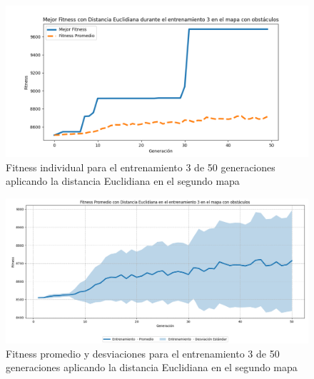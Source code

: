 \documentclass[lettersize, journal]{IEEEtran}
\begin{document}
\begin{figure}[H]
    \centering
    \includegraphics[width=0.9 \linewidth]{Euclidiana/Mapa2/Fitness_3_Map2_Eucli_50Gen.png}
    \caption{Fitness individual para el entrenamiento 3 de 50 generaciones aplicando la distancia Euclidiana en el segundo mapa}
    \label{fig:eucli_3_50_m2}
\end{figure}
\begin{figure}[H]
    \centering
    \includegraphics[width=0.9 \linewidth]{Euclidiana/Mapa2/Fitness_3_Map2_Eucli_50Gen_Sombra.png}
    \caption{Fitness promedio y desviaciones para el entrenamiento 3 de 50 generaciones aplicando la distancia Euclidiana en el segundo mapa}
    \label{fig:eucli_3_50_sombra_m2}
\end{figure}
\end{document}
